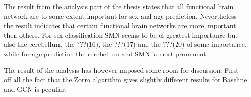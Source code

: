 

        


The result from the analysis part of the thesis states that all functional brain network are to some extent important for sex and age prediction. Nevertheless the result indicates that certain functional brain networks are more important then others. For sex classification SMN seems to be of greatest importance but also the cerebellum, the ???(16), the ???(17) and the ???(20) of some importance, while for age prediction the cerebellum and SMN is most prominent. 


The result of the analysis has however imposed some room for discussion. First off all the fact that the Zorro algorithm gives slightly different results for Baseline and GCN is peculiar. 

